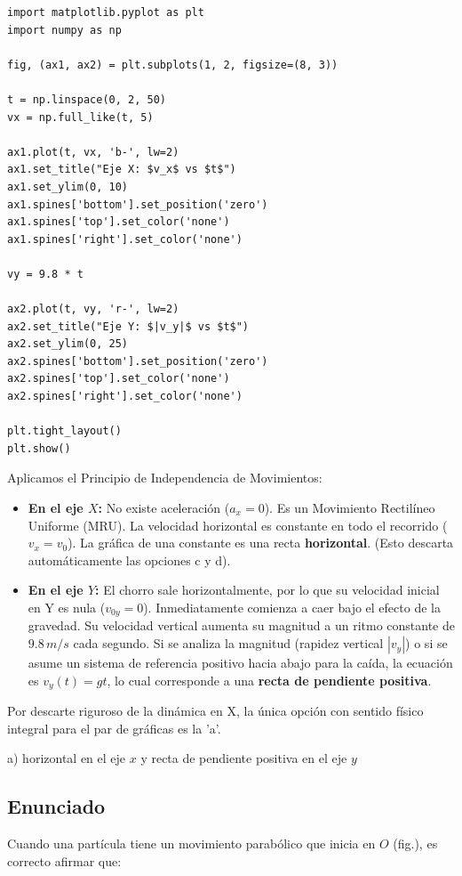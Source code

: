 \documentclass[12pt, a4paper]{article}
\begin{document}
\begin{verbatim}
import matplotlib.pyplot as plt
import numpy as np

fig, (ax1, ax2) = plt.subplots(1, 2, figsize=(8, 3))

t = np.linspace(0, 2, 50)
vx = np.full_like(t, 5)

ax1.plot(t, vx, 'b-', lw=2)
ax1.set_title("Eje X: $v_x$ vs $t$")
ax1.set_ylim(0, 10)
ax1.spines['bottom'].set_position('zero')
ax1.spines['top'].set_color('none')
ax1.spines['right'].set_color('none')

vy = 9.8 * t

ax2.plot(t, vy, 'r-', lw=2)
ax2.set_title("Eje Y: $|v_y|$ vs $t$")
ax2.set_ylim(0, 25)
ax2.spines['bottom'].set_position('zero')
ax2.spines['top'].set_color('none')
ax2.spines['right'].set_color('none')

plt.tight_layout()
plt.show()
\end{verbatim}

Aplicamos el Principio de Independencia de Movimientos:
\begin{itemize}
    \item \textbf{En el eje $X$:} No existe aceleración ($a_x = 0$). Es un Movimiento Rectilíneo Uniforme (MRU). La velocidad horizontal es constante en todo el recorrido ($v_x = v_0$). La gráfica de una constante es una recta \textbf{horizontal}. (Esto descarta automáticamente las opciones c y d).
    \item \textbf{En el eje $Y$:} El chorro sale horizontalmente, por lo que su velocidad inicial en Y es nula ($v_{0y} = 0$). Inmediatamente comienza a caer bajo el efecto de la gravedad. Su velocidad vertical aumenta su magnitud a un ritmo constante de $9.8\,\si{m/s}$ cada segundo. Si se analiza la magnitud (rapidez vertical $|v_y|$) o si se asume un sistema de referencia positivo hacia abajo para la caída, la ecuación es $v_y(t) = gt$, lo cual corresponde a una \textbf{recta de pendiente positiva}.
\end{itemize}
Por descarte riguroso de la dinámica en X, la única opción con sentido físico integral para el par de gráficas es la 'a'.

\begin{tcolorbox}[colback=green!5!white, colframe=green!50!black, title=Respuesta Final]
\centering \Large a) horizontal en el eje $x$ y recta de pendiente positiva en el eje $y$
\end{tcolorbox}

\newpage

\subsection*{Enunciado}
Cuando una partícula tiene un movimiento parabólico que inicia en $O$ (fig.), es correcto afirmar que:
\end{document}
